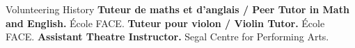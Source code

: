 \begin{rubric}{Volunteering History}
%
	\textbf{Tuteur de maths et d'anglais / Peer Tutor in Math and English.} École FACE.
%
%
	\textbf{Tuteur pour violon / Violin Tutor.} École FACE.
%
%
	\textbf{Assistant Theatre Instructor.} Segal Centre for Performing Arts.
%
\end{rubric}